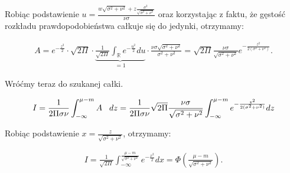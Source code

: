 \documentclass{mini}
\begin{document}
Robiąc podstawienie $u = \frac{w\sqrt{\sigma^2+\nu^2} + z\frac{\sigma^2}{\sqrt{\sigma^2+\nu^2}}}{\nu\sigma}$ oraz korzystając z faktu, że gęstość rozkładu prawdopodobieństwa całkuje się do jedynki, otrzymamy:

\begin{eqnarray*}
A = e^{-\frac{z^2}{2}}\cdot \sqrt{2\Pi}\cdot \underbrace{\frac{1}{\sqrt{2\Pi}} \int_{\mathbb{R}} e^{-\frac{u^2}{2}} du}_{=1} \cdot\frac{\nu\sigma\sqrt{\sigma^2+\nu^2}}{\sigma^2+\nu^2}
=
\sqrt{2\Pi}\frac{\nu\sigma}{\sqrt{\sigma^2+\nu^2}}e^{-\frac{z^2}{2(\sigma^2+\nu^2)}}.
\end{eqnarray*}

Wróćmy teraz do szukanej całki.

\begin{eqnarray*}
I = 
\frac{1}{2\Pi\sigma\nu} \int_{-\infty}^{\mu-m} A\hspace{3mm} dz
=
\frac{1}{2\Pi\sigma\nu} \sqrt{2\Pi}\frac{\nu\sigma}{\sqrt{\sigma^2+\nu^2}}  \int_{-\infty}^{\mu-m} e^{-\frac{z^2}{2(\sigma^2+\nu^2)}} dz
\end{eqnarray*}

Robiąc podstawienie $x = \frac{z}{\sqrt{\sigma^2+\nu^2}}$, otrzymamy:

\begin{eqnarray*}
I = 
\frac{1}{\sqrt{2\Pi}}\int_{-\infty}^{\frac{\mu-m}{\sqrt{\sigma^2+\nu^2}}} e^{-\frac{x^2}{2}} dx = \Phi \left(   \frac{\mu-m}{\sqrt{\sigma^2+\nu^2}}  \right).
\end{eqnarray*}

\end{document}
